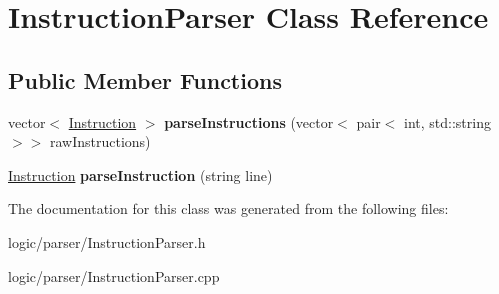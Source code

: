 \hypertarget{classInstructionParser}{}\section{Instruction\+Parser Class Reference}
\label{classInstructionParser}
\subsection*{Public Member Functions}
\begin{DoxyCompactItemize}
\item 
\mbox{\label{classInstructionParser_aa7bced2da59614892f9a5b1e23ef5f0c}} 
vector$<$ \hyperlink{classInstruction}{Instruction} $>$ {\bfseries parse\+Instructions} (vector$<$ pair$<$ int, std\+::string $>$$>$ raw\+Instructions)
\item 
\mbox{\label{classInstructionParser_ab3cf4e392e6921158cdbe3ec6e1e5bbe}} 
\hyperlink{classInstruction}{Instruction} {\bfseries parse\+Instruction} (string line)
\end{DoxyCompactItemize}


The documentation for this class was generated from the following files\+:\begin{DoxyCompactItemize}
\item 
logic/parser/Instruction\+Parser.\+h\item 
logic/parser/Instruction\+Parser.\+cpp\end{DoxyCompactItemize}
